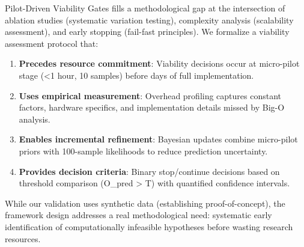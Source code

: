 Pilot-Driven Viability Gates fills a methodological gap at the intersection of ablation studies (systematic variation testing), complexity analysis (scalability assessment), and early stopping (fail-fast principles). We formalize a viability assessment protocol that:

\begin{enumerate}
\item \textbf{Precedes resource commitment}: Viability decisions occur at micro-pilot stage (<1 hour, 10 samples) before days of full implementation.

\item \textbf{Uses empirical measurement}: Overhead profiling captures constant factors, hardware specifics, and implementation details missed by Big-O analysis.

\item \textbf{Enables incremental refinement}: Bayesian updates combine micro-pilot priors with 100-sample likelihoods to reduce prediction uncertainty.

\item \textbf{Provides decision criteria}: Binary stop/continue decisions based on threshold comparison (O\_pred > T) with quantified confidence intervals.
\end{enumerate}

While our validation uses synthetic data (establishing proof-of-concept), the framework design addresses a real methodological need: systematic early identification of computationally infeasible hypotheses before wasting research resources.
